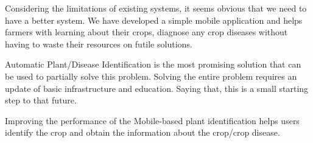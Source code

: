 \documentclass[../Report.tex]{subfiles}
\begin{document}
Considering the limitations of existing systems, it seems obvious that we need to have a better system. We have developed a simple 
mobile application and helps farmers with learning about their crops, diagnose any crop diseases without having to waste their resources
on futile solutions.\par
Automatic Plant/Disease Identification is the most promising solution that can be used to partially solve this problem. Solving the entire
problem requires an update of basic infrastructure and education. Saying that, this is a small starting step to that future.\par
Improving the performance of the Mobile-based plant identification helps users identify the crop and obtain the information about the 
crop/crop disease.\par
\end{document}
